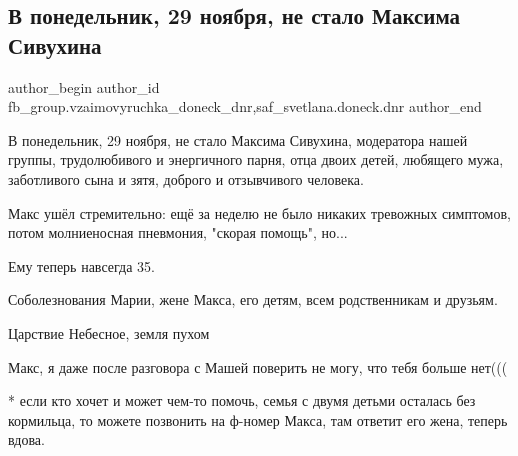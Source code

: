  
 
 
 
 
 
\subsection{В понедельник, 29 ноября, не стало Максима Сивухина}
\label{sec:29_11_2021.fb.fb_group.vzaimovyruchka_doneck_dnr.1.maksim_sivuhin_smert}
 
\ifcmt
 author_begin
   author_id fb_group.vzaimovyruchka_doneck_dnr,saf_svetlana.doneck.dnr
 author_end
\fi

В понедельник, 29 ноября, не стало Максима Сивухина, модератора нашей группы,
трудолюбивого и энергичного парня, отца двоих детей, любящего мужа, заботливого
сына и зятя, доброго и отзывчивого человека. 


Макс ушёл стремительно:  ещё за неделю не было никаких тревожных симптомов,
потом молниеносная пневмония, "скорая помощь", но...

Ему теперь навсегда 35.

Соболезнования Марии, жене Макса, его детям, всем родственникам и друзьям.

Царствие Небесное, земля пухом

Макс, я даже после разговора с Машей поверить не могу, что тебя больше нет(((

* если кто хочет и может чем-то помочь, семья с двумя детьми осталась без
кормильца, то можете позвонить на ф-номер Макса, там ответит его жена, теперь
вдова.

